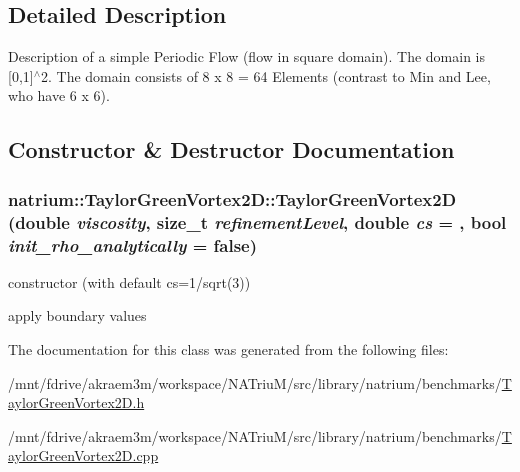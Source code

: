 \subsection{Detailed Description}
Description of a simple Periodic Flow (flow in square domain). The domain is \mbox{[}0,1\mbox{]}$^\wedge$2. The domain consists of 8 x 8 = 64 Elements (contrast to Min and Lee, who have 6 x 6). 

\subsection{Constructor \& Destructor Documentation}
\hypertarget{classnatrium_1_1TaylorGreenVortex2D_a48410d029b8a0f9801b66efda45aa77f}{
\subsubsection[{TaylorGreenVortex2D}]{\setlength{\rightskip}{0pt plus 5cm}natrium::TaylorGreenVortex2D::TaylorGreenVortex2D (double {\em viscosity}, \/  size\_\-t {\em refinementLevel}, \/  double {\em cs} = {}, \/  bool {\em init\_\-rho\_\-analytically} = {\ttfamily false})}}
\label{classnatrium_1_1TaylorGreenVortex2D_a48410d029b8a0f9801b66efda45aa77f}


constructor (with default cs=1/sqrt(3)) 

apply boundary values 

The documentation for this class was generated from the following files:\begin{DoxyCompactItemize}
\item 
/mnt/fdrive/akraem3m/workspace/NATriuM/src/library/natrium/benchmarks/\hyperlink{TaylorGreenVortex2D_8h}{TaylorGreenVortex2D.h}\item 
/mnt/fdrive/akraem3m/workspace/NATriuM/src/library/natrium/benchmarks/\hyperlink{TaylorGreenVortex2D_8cpp}{TaylorGreenVortex2D.cpp}\end{DoxyCompactItemize}
